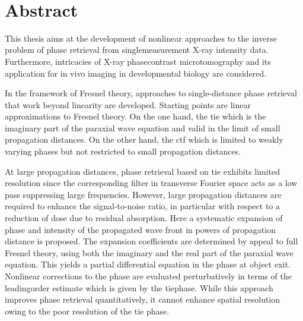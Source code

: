 \documentclass[
twoside,
openright,
titlepage,
numbers=noenddot,
headinclude,
fleqn,
a4paper,
footinclude=true,
cleardoublepage=empty,
abstractoff,
BCOR=5mm,
paper=a4,
fontsize=11pt,
british,ngerman,american,
]{scrreprt}
\begin{document}
\thispagestyle{empty}
\begin{center}
    \spacedlowsmallcaps{\myName} \\ \medskip                        
    \begingroup
        \spacedallcaps{\myTitle}
    \endgroup
\end{center}   
\cleardoublepage

\begingroup
\let\clearpage\relax
\let\cleardoublepage\relax
\let\cleardoublepage\relax
\chapter*{Abstract}

This thesis aims at the development of nonlinear approaches to the
inverse problem of phase retrieval from single\hyph measurement X-ray
intensity data.  Furthermore, intricacies of X-ray phase\hyph contrast
microtomography and its application for in vivo imaging in
developmental biology are considered.

In the framework of Fresnel theory, approaches to single-distance
phase retrieval that work beyond linearity are developed.  Starting
points are linear approximations to Fresnel theory.  On the one hand,
the \ac{tie} which is the imaginary part of the paraxial wave equation
and  valid in the limit of small propagation distances. On the other
hand, the \ac{ctf} which is limited to weakly varying phases but not
restricted to small propagation distances.

At large propagation distances, phase retrieval based on \ac{tie}
exhibits limited resolution since the corresponding filter in
transverse Fourier space acts as a low pass suppressing large
frequencies.  However, large propagation distances are required to
enhance the signal-to-noise ratio, in particular with respect to a
reduction of dose due to residual absorption.  Here a systematic
expansion of phase and intensity of the propagated wave front in
powers of propagation distance is proposed.  The expansion
coefficients are determined by appeal to full Fresnel theory, \ie{}
using both the imaginary and the real part of the paraxial wave
equation.  This yields a partial differential equation in the phase at
object exit.  Nonlinear corrections to the phase are evaluated
perturbatively in terms of the leading\hyph order estimate which is
given by the \ac{tie}\hyph phase.  While this approach improves phase
retrieval quantitatively, it cannot enhance spatial resolution owing
to the poor resolution of the \ac{tie} phase.
\end{document}

